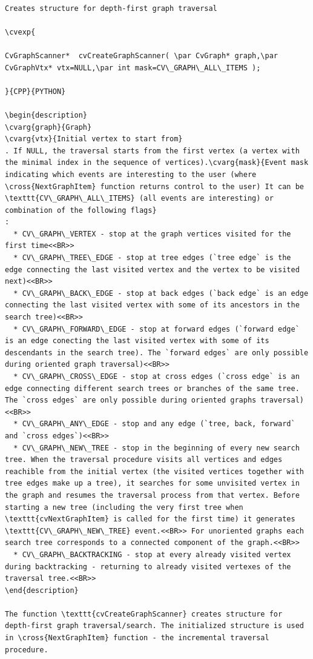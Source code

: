 \label{CreateGraphScanner}
\begin{verbatim}

Creates structure for depth-first graph traversal

\cvexp{

CvGraphScanner*  cvCreateGraphScanner( \par CvGraph* graph,\par CvGraphVtx* vtx=NULL,\par int mask=CV\_GRAPH\_ALL\_ITEMS );

}{CPP}{PYTHON}

\begin{description}
\cvarg{graph}{Graph}
\cvarg{vtx}{Initial vertex to start from}
. If NULL, the traversal starts from the first vertex (a vertex with the minimal index in the sequence of vertices).\cvarg{mask}{Event mask indicating which events are interesting to the user (where \cross{NextGraphItem} function returns control to the user) It can be \texttt{CV\_GRAPH\_ALL\_ITEMS} (all events are interesting) or combination of the following flags}
:
  * CV\_GRAPH\_VERTEX - stop at the graph vertices visited for the first time<<BR>>
  * CV\_GRAPH\_TREE\_EDGE - stop at tree edges (`tree edge` is the edge connecting the last visited vertex and the vertex to be visited next)<<BR>>
  * CV\_GRAPH\_BACK\_EDGE - stop at back edges (`back edge` is an edge connecting the last visited vertex with some of its ancestors in the search tree)<<BR>>
  * CV\_GRAPH\_FORWARD\_EDGE - stop at forward edges (`forward edge` is an edge conecting the last visited vertex with some of its descendants in the search tree). The `forward edges` are only possible during oriented graph traversal)<<BR>>
  * CV\_GRAPH\_CROSS\_EDGE - stop at cross edges (`cross edge` is an edge connecting different search trees or branches of the same tree. The `cross edges` are only possible during oriented graphs traversal)<<BR>>
  * CV\_GRAPH\_ANY\_EDGE - stop and any edge (`tree, back, forward` and `cross edges`)<<BR>>
  * CV\_GRAPH\_NEW\_TREE - stop in the beginning of every new search tree. When the traversal procedure visits all vertices and edges reachible from the initial vertex (the visited vertices together with tree edges make up a tree), it searches for some unvisited vertex in the graph and resumes the traversal process from that vertex. Before starting a new tree (including the very first tree when \texttt{cvNextGraphItem} is called for the first time) it generates \texttt{CV\_GRAPH\_NEW\_TREE} event.<<BR>> For unoriented graphs each search tree corresponds to a connected component of the graph.<<BR>>
  * CV\_GRAPH\_BACKTRACKING - stop at every already visited vertex during backtracking - returning to already visited vertexes of the traversal tree.<<BR>>
\end{description}

The function \texttt{cvCreateGraphScanner} creates structure for depth-first graph traversal/search. The initialized structure is used in \cross{NextGraphItem} function - the incremental traversal procedure.


\end{verbatim}
